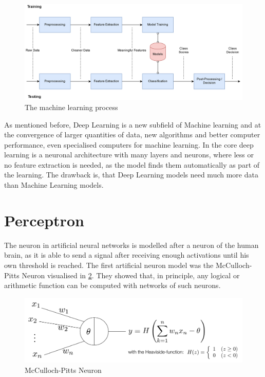 \documentclass[11pt]{article}
\begin{document}
\begin{figure}[hbt]
	\centering
	\includegraphics[width=0.8\linewidth, keepaspectratio]{img/machine_learning_process}
	\caption{The machine learning process}
	\label{fig:machinelearningprocess}
\end{figure}

As mentioned before, Deep Learning is a new subfield of Machine learning and at the convergence of larger quantities of data, new algorithms and better computer performance, even specialised computers for machine learning. In the core deep learning is a neuronal architecture with many layers and neurons, where less or no feature extraction is needed, as the model finds them automatically as part of the learning. The drawback is, that Deep Learning models need much more data than Machine Learning models.

\section{Perceptron}

The neuron in artificial neural networks is modelled after a neuron of the human brain, as it is able to send a signal after receiving enough activations until his own threshold is reached. The first artificial neuron model was the McCulloch-Pitts Neuron visualised in \ref{fig:mccullochpittsneuron}. They showed that, in principle, any logical or arithmetic function can be computed with networks of such neurons.

\begin{figure}[hbt]
	\centering
	\includegraphics[width=0.8\linewidth, keepaspectratio]{img/mcculloch_pitts_neuron}
	\caption{McCulloch-Pitts Neuron}
	\label{fig:mccullochpittsneuron}
\end{figure}
\end{document}
